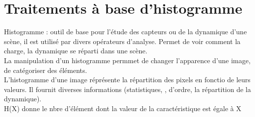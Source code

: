 \documentclass[11pt]{cours}
\begin{document}
\newpage

\section{Traitements à base d'histogramme}

Histogramme : outil de base pour l'étude des capteurs ou de la dynamique d'une scène, il est utilisé par divers opérateurs d'analyse. Permet de voir comment la charge, la dynamique se réparti dans une scène.\\

La manipulation d'un histogramme permmet de changer l'apparence d'une image, de catégoriser des éléments.\\

L'histogramme d'une image réprésente la répartition des pixels en fonctio de leurs valeurs. Il fournit diverses informations (statistiques, , d'ordre, la répartition de la dynamique).\\

H(X) donne le nbre d'élément dont la valeur de la caractéristique est égale à X

\vskip 2cm
\end{document}

